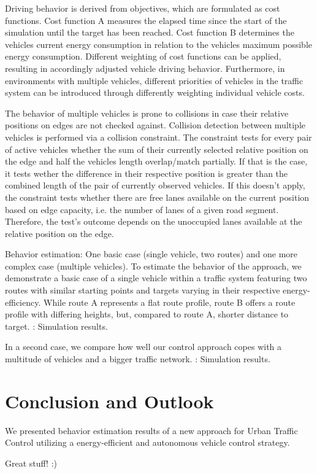 \documentclass[conference]{../cls/IEEEtran}
\begin{document}
Driving behavior is derived from objectives, which are formulated as cost
functions. Cost function A measures the elapsed time since the start of the
simulation until the target has been reached. Cost function B
determines the vehicles current energy consumption in relation to the
vehicles maximum possible energy consumption. Different weighting of cost
functions can be applied, resulting in accordingly adjusted vehicle driving
behavior. Furthermore, in environments with multiple vehicles, different
priorities of vehicles in the traffic system can be introduced through
differently weighting individual vehicle costs.

The behavior of multiple vehicles is prone to collisions in case their relative
positions on edges are not checked against. Collision detection between
multiple vehicles is performed via a collision constraint. The constraint tests
for every pair of active vehicles whether the sum of their currently selected
relative position on the edge and half the vehicles length overlap/match
partially.
If that is the case, it tests wether the difference in their respective position 
is greater than the combined length of the pair of currently observed vehicles. 
If this doesn't apply, the constraint
tests whether there are free lanes available on the current position based on
edge capacity, i.e. the number of lanes of a given road segment. Therefore, the
test's outcome depends on the unoccupied lanes available at the relative
position on the edge.

Behavior estimation: One basic case (single vehicle, two routes) and one more complex case (multiple vehicles).
To estimate the behavior of the approach, we demonstrate a basic case of a
single vehicle within a traffic system featuring two routes with similar
starting points and targets varying in their respective energy-efficiency. While
route A represents a flat route profile, route B offers a route profile with differing heights, but, compared to route A,
shorter distance to target. : Simulation results.

In a second case, we compare how well our control approach copes with a
multitude of vehicles and a bigger traffic network. : Simulation results.

\section{Conclusion and Outlook}

We presented behavior estimation results of a new approach for Urban Traffic
Control utilizing a energy-efficient and autonomous vehicle control strategy.

Great stuff! :)



\end{document}
